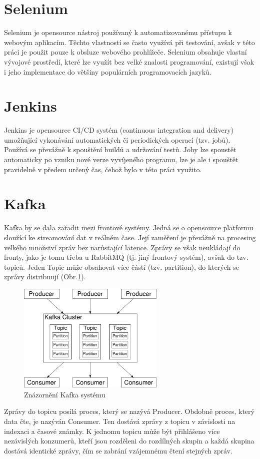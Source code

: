 \documentclass[thesis=M,czech,hidelinks]{FITthesis}[2013/05/06]
\begin{document}
\section{Selenium} \label{sec:selenium}
Selenium je opensource nástroj používaný k automatizovanému přístupu k webovým aplikacím. Těchto vlastností se často využívá při testování, avšak v této práci je použit pouze k obsluze webového prohlížeče. Selenium obsahuje vlastní vývojové prostředí, které lze využít bez velké znalosti programování, existují však i jeho implementace do většiny populárních programovacích jazyků.


\section{Jenkins} \label{sec:jenkins}
Jenkins je opensource CI/CD systém (continuous integration and delivery) umožňující vykonávání automatických či periodických operací (tzv. jobů). Používá se převážně k spouštění buildů a udržování testů. Joby lze spoustět automaticky po vzniku nové verze vyvíjeného programu, lze je ale i spouštět pravidelně v předem určený čas, čehož bylo v této práci využito.

\section{Kafka}\label{sec:kafka}
Kafka by se dala zařadit mezi frontové systémy. Jedná se o opensource platformu sloužící ke streamování dat v reálném čase. Její zaměření je převážně na procesing velkého množství zpráv bez narůstající latence. Zprávy se však neukládají do fronty, jako je tomu třeba u RabbitMQ (tj. jiný frontový systém), avšak do tzv. topiců. Jeden Topic může obsahovat více částí (tzv. partition), do kterých se zprávy distribuují (Obr.\ref{fig:kafka}). 
\begin{figure}[h]
	\centering
	\includegraphics[width=7cm]{pictures/kafka.png}
	\caption{Znázornění Kafka systému \cite{kafka}}
	\label{fig:kafka}
\end{figure}
Zprávy do topicu posílá proces, který se nazývá Producer. Obdobně proces, který data čte, je nazýván Consumer. Ten dostává zprávy z topicu v závislosti na indexaci a časové známky. K jednomu topicu může být přihlášeno více nezávislých konzumerů, kteří jsou rozděleni do rozdílných skupin a každá skupina dostává identické zprávy, čím se zabrání vzájemnému čtení stejných zpráv.
\end{document}
